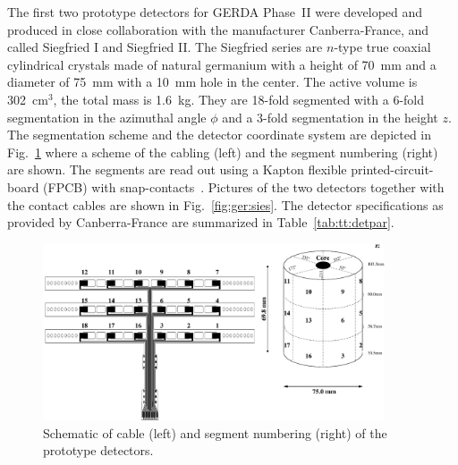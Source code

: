 The first two prototype detectors for GERDA Phase~II were developed and produced in close collaboration with the manufacturer Canberra-France, and called Siegfried I and Siegfried II. The Siegfried series are $n$-type true coaxial cylindrical crystals made of natural germanium with a height of 70~mm and a diameter of 75~mm with a 10~mm hole in the center. The active volume is 302~cm$^{3}$, the total mass is 1.6~kg. They are 18-fold segmented with a 6-fold segmentation in the azimuthal angle $\phi$ and a 3-fold segmentation in the height $z$. The segmentation scheme and the detector coordinate system are depicted in Fig.~\ref{fig:ger:segm} where a scheme of the cabling (left) and the segment numbering (right) are shown. The segments are read out using a Kapton flexible printed-circuit-board (FPCB) with snap-contacts~\cite{Sie07}. Pictures of the two detectors together with the contact cables are shown in Fig.~\ref{fig:ger:sies}. The detector specifications as provided by Canberra-France are summarized in Table~\ref{tab:tt:detpar}.

\begin{figure}[tbhp]
  \centering
  \includegraphics[width=0.9\textwidth]{segmentation_scheme}  
  \caption{Schematic of cable (left) and segment numbering (right) of     the prototype detectors.}
  \label{fig:ger:segm}
\end{figure}

